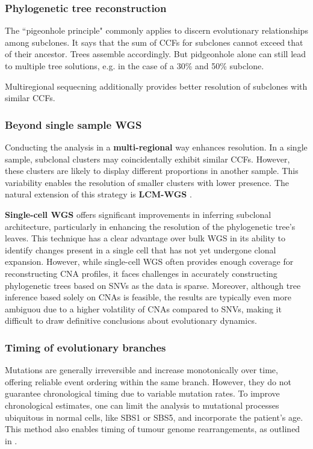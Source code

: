 {    \subsubsection*{Phylogenetic tree reconstruction}

    The ``pigeonhole principle" commonly applies to discern evolutionary relationships among subclones. It says that the sum of \acp{CCF} for subclones cannot exceed that of their ancestor. Trees assemble accordingly. But pidgeonhole alone can still lead to multiple tree solutions, e.g. in the case of a 30\% and 50\% subclone.
    
    Multiregional sequecning additionally provides better resolution of subclones with similar \acp{CCF}.

    \subsubsection*{Beyond single sample \ac{WGS}}

    Conducting the analysis in a \textbf{multi-regional} way enhances resolution. In a single sample, subclonal clusters may coincidentally exhibit similar \acp{CCF}. However, these clusters are likely to display different proportions in another sample. This variability enables the resolution of smaller clusters with lower presence. The natural extension of this strategy is \textbf{\ac{LCM}-\ac{WGS}} .

    \textbf{Single-cell \ac{WGS}} offers significant improvements in inferring subclonal architecture, particularly in enhancing the resolution of the phylogenetic tree's leaves. This technique has a clear advantage over bulk \ac{WGS} in its ability to identify changes present in a single cell that has not yet undergone clonal expansion. However, while single-cell \ac{WGS} often provides enough coverage for reconstructing \ac{CNA} profiles, it faces challenges in accurately constructing phylogenetic trees based on \acp{SNV} as the data is sparse. Moreover, although tree inference based solely on \acp{CNA} is feasible, the results are typically even more ambiguou due to a higher volatility of \acp{CNA} compared to \acp{SNV}, making it difficult to draw definitive conclusions about evolutionary dynamics.

    \subsubsection*{Timing of evolutionary branches}
    Mutations are generally irreversible and increase monotonically over time, offering reliable event ordering within the same branch. However, they do not guarantee chronological timing due to variable mutation rates. To improve chronological estimates, one can limit the analysis to mutational processes ubiquitous in normal cells, like SBS1 or SBS5, and incorporate the patient's age. This method also enables timing of tumour genome rearrangements, as outlined in \textcite{Gerstung2020-sg}.
    }


